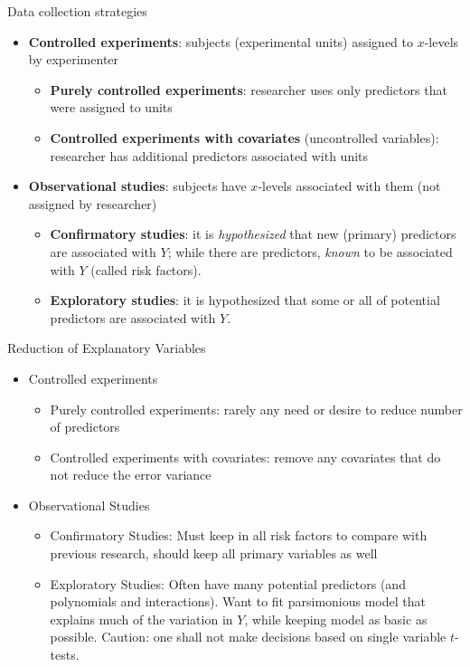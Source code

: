 \documentclass{beamer}
\begin{document}
\begin{frame}{Data collection strategies}
\begin{itemize}
    \item \textbf{Controlled experiments}: subjects (experimental units) assigned to $x$-levels by experimenter
    \begin{itemize}
        \item<2-> \textbf{Purely controlled experiments}: researcher  uses only predictors that were assigned to units
        \item<3-> \textbf{Controlled experiments with covariates} (uncontrolled variables): researcher has additional predictors associated with units
    \end{itemize}
    \item<4-> \textbf{Observational studies}: subjects have $x$-levels associated with them (not assigned by researcher)
    \begin{itemize}
        \item<5-> \textbf{Confirmatory studies}: it is \textit{hypothesized} that new (primary) predictors are associated with $Y$; \pause while there are predictors, \textit{known} to be associated with $Y$ (called risk factors).
        \item<6-> \textbf{Exploratory studies}: it is hypothesized that some or all of potential predictors are associated with $Y$.
    \end{itemize}
\end{itemize}
\end{frame}


\begin{frame}{Reduction of Explanatory Variables}
\begin{itemize}
    \item Controlled experiments
    \begin{itemize}
        \item\pause Purely controlled experiments: rarely any need or desire to reduce number of predictors
        \item\pause Controlled experiments with covariates: remove any covariates that do not reduce the error variance
    \end{itemize}
    \item\pause Observational Studies
    \begin{itemize}
        \item\pause Confirmatory Studies: Must keep in all risk factors to compare with previous research, should keep all primary variables as well
        \item\pause Exploratory Studies: Often have many potential predictors (and polynomials and interactions). \pause Want to fit parsimonious model that explains much of the variation in $Y$, while keeping model as basic as possible. \pause Caution: one shall not make decisions based on single variable $t$-tests.
    \end{itemize}
\end{itemize}

    
\end{frame}
\end{document}
